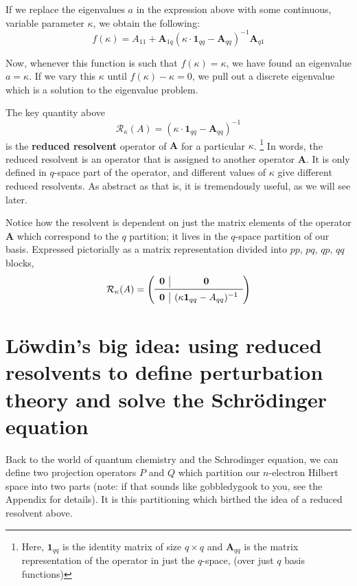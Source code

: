 \documentclass{article}
\begin{document}
If we replace the eigenvalues $a$ in the expression above with some continuous, variable parameter $\kappa$, we obtain the following: 
\[f(\kappa) =  A_{11} + \mathbf{A}_{1q}( \kappa \cdot \mathbf{1}_{qq} - \mathbf{A}_{qq})^{-1} \mathbf{A}_{q1} \]

Now, whenever this function is such that $f(\kappa) = \kappa $, we have found an eigenvalue $a = \kappa$.
If we vary this $\kappa$ until $f(\kappa) - \kappa = 0$, we pull out a discrete eigenvalue which is a solution to the eigenvalue problem. 

The key quantity above 
\[\mathcal{R}_{\kappa}(A) = ( \kappa \cdot \mathbf{1}_{qq} - \mathbf{A}_{qq})^{-1}\]
is the \textbf{reduced resolvent} operator of $\mathbf{A}$ for a particular $\kappa$.
\footnote{Here, $\mathbf{1}_{qq}$ is the identity matrix of size $q \times q$ and $\mathbf{A}_{qq}$ is 
 the matrix representation of the operator in just the $q$-space, (over just $q$ basis functions)}
In words, the reduced resolvent is an operator that is assigned to another operator $\mathbf{A}$.
It is only defined in $q$-space part of the operator, and different values of $\kappa$ give different reduced resolvents.
As abstract as that is, it is tremendously useful, as we will see later.

Notice how the resolvent is dependent on just the matrix elements of the operator $\mathbf{A}$
which correspond to the $q$ partition; it lives in the $q$-space partition of our basis.
Expressed pictorially as a matrix representation divided into $pp$, $pq$, $qp$, $qq$ blocks,
\[\mathcal{R}_{\kappa}(A) =
\left( \begin{array}{c|c}
   \mathbf{0} & \mathbf{0} \\
   \midrule
   \mathbf{0} & (\kappa \mathbf{1}_{qq} - A_{qq})^{-1} \\
\end{array}\right)
  \]

\section{L{\"o}wdin's big idea: using reduced resolvents to define perturbation theory and solve the Schr{\"o}dinger equation}
Back to the world of quantum chemistry and the Schrodinger equation, 
we can define two projection operators $P$ and $Q$ which partition our $n$-electron Hilbert space into two parts (note: if that sounds like gobbledygook to you, see the Appendix for details).
It is this partitioning which birthed the idea of a reduced resolvent above.
\end{document}
